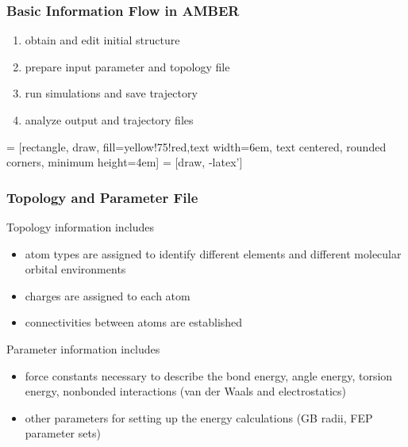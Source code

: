 \documentclass[slidestop,mathserif,compress,xcolor=svgnames]{beamer}
\begin{document}
\begin{frame}
  \frametitle{\small Basic Information Flow in AMBER}
  \begin{block}{}
    \begin{enumerate}
      \item obtain and edit initial structure
      \item prepare input parameter and topology file
      \item run simulations and save trajectory
      \item analyze output and trajectory files
    \end{enumerate}
    \scriptsize{
     = [rectangle, draw, fill=yellow!75!red,text width=6em, text centered, rounded corners, minimum height=4em]
     = [draw, -latex']
    }
  \end{block}
\end{frame}

\begin{frame}
  \frametitle{\small Topology and Parameter File}
  \begin{block}{Topology information includes}
    \begin{itemize}
      \item atom types are assigned to identify different elements and different molecular orbital environments
      \item charges are assigned to each atom
      \item connectivities between atoms are established
    \end{itemize}
  \end{block}
  \begin{block}{Parameter information includes}
    \begin{itemize}
      \item force constants necessary to describe the bond energy, angle energy, torsion energy, nonbonded interactions (van der Waals and electrostatics)
      \item other parameters for setting up the energy calculations (GB radii, FEP parameter sets)
    \end{itemize}
  \end{block}
\end{frame}
\end{document}
